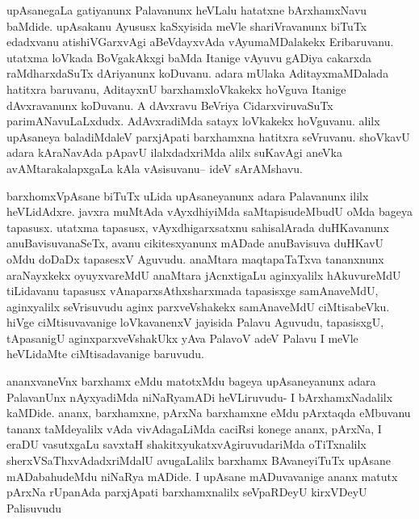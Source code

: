 
\begin{artha}
upAsanegaLa gatiyanunx Palavanunx heVLalu hatatxne bArxhamxNavu baMdide. upAsakanu Ayususx kaSxyisida meVle shariVravanunx biTuTx edadxvanu atishiVGarxvAgi aBeVdayxvAda vAyumaMDalakekx Eribaruvanu. utatxma loVkada BoVgakAkxgi baMda Itanige vAyuvu gADiya cakarxda raMdharxdaSuTx dAriyanunx koDuvanu. adara mUlaka AditayxmaMDalada hatitxra baruvanu, AditayxnU barxhamxloVkakekx hoVguva Itanige dAvxravanunx koDuvanu. A dAvxravu BeVriya CidarxviruvaSuTx parimANavuLaLxdudx. AdAvxradiMda satayx loVkakekx hoVguvanu. alilx upAsaneya baladiMdaleV parxjApati barxhamxna hatitxra seVruvanu. shoVkavU adara kAraNavAda pApavU ilalxdadxriMda alilx suKavAgi aneVka avAMtarakalapxgaLa kAla vAsisuvanu{\rm --} ideV sArAMshavu.
\end{artha}


\begin{artha}
barxhomxVpAsane biTuTx uLida upAsaneyanunx adara Palavanunx ililx heVLidAdxre. javxra muMtAda vAyxdhiyiMda saMtapisudeMbudU oMda bageya tapasusx. utatxma tapasusx, vAyxdhigarxsatxnu sahisalArada duHKavanunx anuBavisuvanaSeTx, avanu cikitesxyanunx mADade anuBavisuva duHKavU oMdu doDaDx tapasesxV Aguvudu. anaMtara maqtapaTaTxva tananxnunx araNayxkekx oyuyxvareMdU anaMtara jAcnxtigaLu aginxyalilx hAkuvureMdU tiLidavanu tapasusx vAnaparxsAthxsharxmada tapasisxge samAnaveMdU, aginxyalilx seVrisuvudu aginx parxveVshakekx samAnaveMdU ciMtisabeVku. hiVge ciMtisuvavanige loVkavanenxV jayisida Palavu Aguvudu, tapasisxgU, tApasanigU aginxparxveVshakUkx yAva PalavoV adeV Palavu I meVle heVLidaMte ciMtisadavanige baruvudu.
\end{artha}


\begin{artha}
ananxvaneVnx barxhamx eMdu matotxMdu bageya upAsaneyanunx adara PalavanUnx nAyxyadiMda niNaRyamADi heVLiruvudu- I bArxhamxNadalilx kaMDide. ananx, barxhamxne, pArxNa barxhamxne eMdu pArxtaqda eMbuvanu tananx taMdeyalilx vAda vivAdagaLiMda caciRsi konege ananx, pArxNa, I eraDU vasutxgaLu savxtaH shakitxyukatxvAgiruvudariMda oTiTxnalilx sherxVSaThxvAdadxriMdalU avugaLalilx barxhamx BAvaneyiTuTx upAsane mADabahudeMdu niNaRya mADide. I upAsane mADuvavanige ananx matutx pArxNa rUpanAda parxjApati barxhamxnalilx seVpaRDeyU kirxVDeyU Palisuvudu
\end{artha}


